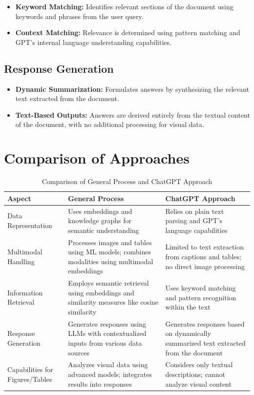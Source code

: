 \documentclass[12pt]{article}
\begin{document}
\begin{itemize}
    \item \textbf{Keyword Matching:} Identifies relevant sections of the document using keywords and phrases from the user query.
    \item \textbf{Context Matching:} Relevance is determined using pattern matching and GPT's internal language understanding capabilities.
\end{itemize}

\subsection{Response Generation}

\begin{itemize}
    \item \textbf{Dynamic Summarization:} Formulates answers by synthesizing the relevant text extracted from the document.
    \item \textbf{Text-Based Outputs:} Answers are derived entirely from the textual content of the document, with no additional processing for visual data.
\end{itemize}

\section{Comparison of Approaches}

\begin{table}[h!]
\centering
\begin{tabular}{|l|p{5cm}|p{5cm}|}
\hline
\textbf{Aspect} & \textbf{General Process} & \textbf{ChatGPT Approach} \\ \hline
Data Representation & Uses embeddings and knowledge graphs for semantic understanding & Relies on plain text parsing and GPT's language capabilities \\ \hline
Multimodal Handling & Processes images and tables using ML models; combines modalities using multimodal embeddings & Limited to text extraction from captions and tables; no direct image processing \\ \hline
Information Retrieval & Employs semantic retrieval using embeddings and similarity measures like cosine similarity & Uses keyword matching and pattern recognition within the text \\ \hline
Response Generation & Generates responses using LLMs with contextualized inputs from various data sources & Generates responses based on dynamically summarized text extracted from the document \\ \hline
Capabilities for Figures/Tables & Analyzes visual data using advanced models; integrates results into responses & Considers only textual descriptions; cannot analyze visual content \\ \hline
\end{tabular}
\caption{Comparison of General Process and ChatGPT Approach}
\end{table}
\end{document}
